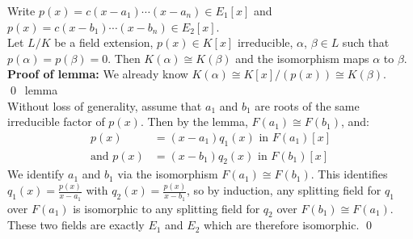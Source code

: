 Write $p(x)=c(x-a_1)\dotsm(x-a_n)\in E_1[x]$ and $p(x)=c(x-b_1)\dotsm(x-b_n)\in E_2[x]$. \\ %
\lem Let $L/K$ be a field extension, $p(x)\in K[x]$ irreducible, $\alpha$, $\beta\in L$ such that $p(\alpha)=p(\beta)=0$.  Then $K(\alpha)\cong K(\beta)$ and the isomorphism maps $\alpha$ to $\beta$. \\
\textbf{Proof of lemma:} We already know $K(\alpha)\cong K[x]/(p(x))\cong K(\beta)$. \qed~lemma \\
Without loss of generality, assume that $a_1$ and $b_1$ are roots of the same irreducible factor of $p(x)$.  Then by the lemma, $F(a_1)\cong F(b_1)$, and:
\begin{align*}
p(x) &= (x-a_1)q_1(x) \text{ in } F(a_1)[x] \\
\text{and } p(x) &= (x-b_1)q_2(x) \text{ in } F(b_1)[x]
\end{align*}
We identify $a_1$ and $b_1$ via the isomorphism $F(a_1)\cong F(b_1)$.  This identifies $q_1(x)=\frac{p(x)}{x-a_1}$ with $q_2(x)=\frac{p(x)}{x-b_1}$, so by induction, any splitting field for $q_1$ over $F(a_1)$ is isomorphic to any splitting field for $q_2$ over $F(b_1)\cong F(a_1)$.  These two fields are exactly $E_1$ and $E_2$ which are therefore isomorphic. \qed
